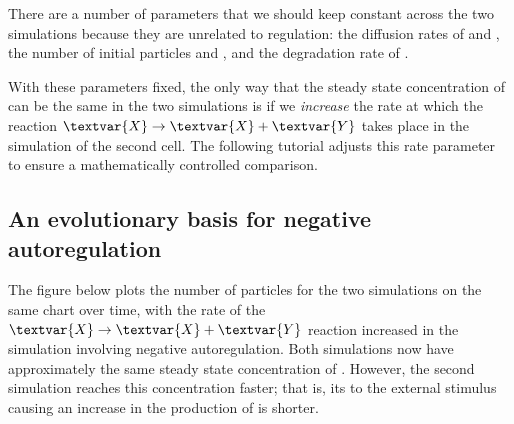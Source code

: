 \begin{qbox}\end{qbox} 

There are a number of parameters that we should keep constant across the two simulations because they are unrelated to regulation: the diffusion rates of  and , the number of initial particles  and , and the degradation rate of .

With these parameters fixed, the only way that the steady state concentration of  can be the same in the two simulations is if we \textit{increase} the rate at which the reaction $\textvar{X} \rightarrow \textvar{X} + \textvar{Y}$ takes place in the simulation of the second cell. The following tutorial adjusts this rate parameter to ensure a mathematically controlled comparison.


\FloatBarrier
{}
\subsection{An evolutionary basis for negative autoregulation}

The figure below plots the number of  particles for the two simulations on the same chart over time, with the rate of the $\textvar{X} \rightarrow \textvar{X} + \textvar{Y}$ reaction increased in the simulation involving negative autoregulation. Both  simulations now have approximately the same steady state concentration of . However, the second simulation reaches this concentration faster; that is, its  to the external stimulus causing an increase in the production of  is shorter.\\

